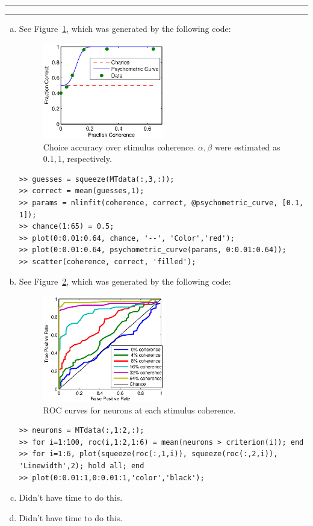 \documentclass[11pt]{article}
\newcounter{questionCounter}
\newcounter{partCounter}[questionCounter]
\newenvironment{question}[2][\arabic{questionCounter}]{%
    \setcounter{partCounter}{0}%
    \vspace{.25in} \hrule \vspace{0.5em}%
        \noindent{\bf #2}%
    \vspace{0.8em} \hrule \vspace{.10in}%
    \addtocounter{questionCounter}{1}%
}{}
\begin{document}
\newpage
\begin{question}{Problem 2}
\begin{enumerate}[a.]
\item See Figure~\ref{fig:2.a}, which was generated by the following code:
\begin{figure}[h]
\begin{center}
\includegraphics[width=0.5\textwidth]{2.a.eps}
\end{center}
\caption{Choice accuracy over stimulus coherence. $\alpha, \beta$ were
estimated as $0.1, 1$, respectively.}
\label{fig:2.a}
\end{figure}
\begin{verbatim}
>> guesses = squeeze(MTdata(:,3,:));
>> correct = mean(guesses,1);
>> params = nlinfit(coherence, correct, @psychometric_curve, [0.1, 1]);
>> chance(1:65) = 0.5;
>> plot(0:0.01:0.64, chance, '--', 'Color','red');
>> plot(0:0.01:0.64, psychometric_curve(params, 0:0.01:0.64));
>> scatter(coherence, correct, 'filled');
\end{verbatim}

\item See Figure~\ref{fig:2.b}, which was generated by the following code:
\begin{figure}[h]
\begin{center}
\includegraphics[width=0.5\textwidth]{2.b.eps}
\end{center}
\caption{ROC curves for neurons at each stimulus coherence.}
\label{fig:2.b}
\end{figure}
\begin{verbatim}
>> neurons = MTdata(:,1:2,:);
>> for i=1:100, roc(i,1:2,1:6) = mean(neurons > criterion(i)); end
>> for i=1:6, plot(squeeze(roc(:,1,i)), squeeze(roc(:,2,i)), 'Linewidth',2); hold all; end
>> plot(0:0.01:1,0:0.01:1,'color','black');
\end{verbatim}


\item Didn't have time to do this.

\item Didn't have time to do this.

\end{enumerate}
\end{question}
\end{document}
